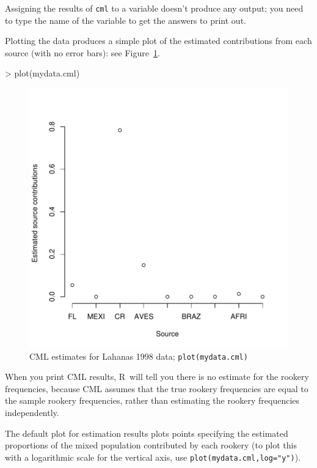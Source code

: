 \documentclass[11pt]{article}
\newcommand{\R}{{\sf R}}
\newcommand{\code}[1]{{\tt #1}}
\begin{document}
Assigning the results of \code{cml} to a variable
doesn't produce any output; you need to type
the name of the variable to get the answers
to print out.

Plotting the data produces a simple plot
of the estimated contributions from each
source (with no error bars): see Figure~\ref{fig:cml1}.
\begin{Schunk}
\begin{Sinput}
> plot(mydata.cml)
\end{Sinput}
\end{Schunk}

\begin{figure}
\includegraphics{mixstock-016}
\caption{CML estimates for Lahanas 1998 data;
\code{plot(mydata.cml)}}
\label{fig:cml1}
\end{figure}
When you print CML results, \R\ will tell you there is no estimate for
the rookery frequencies, because CML assumes that the true rookery
frequencies are equal to the sample rookery frequencies, rather than
estimating the rookery frequencies independently.

The default plot for estimation results plots
points specifying the estimated
proportions of the mixed population contributed by each
rookery (to plot this with a logarithmic scale
for the vertical axis, use
{\tt plot(mydata.cml,log="y")}).
\end{document}
